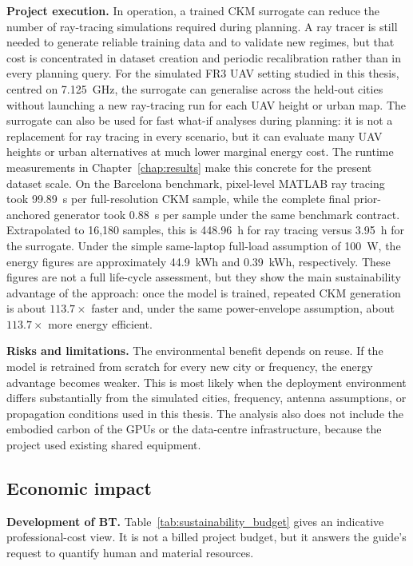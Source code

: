 \textbf{Project execution.} In operation, a trained CKM surrogate can reduce
the number of ray-tracing simulations required during planning. A ray tracer is
still needed to generate reliable training data and to validate new regimes,
but that cost is concentrated in dataset creation and periodic recalibration
rather than in every planning query. For the simulated FR3 UAV setting studied
in this thesis, centred on \SI{7.125}{GHz}, the surrogate can generalise across
the held-out cities without launching a new ray-tracing run for each UAV height
or urban map.
The surrogate can also be used for fast what-if analyses during planning:
it is not a replacement for ray tracing in every scenario, but it can evaluate
many UAV heights or urban alternatives at much lower marginal energy cost.
The runtime measurements in Chapter~\ref{chap:results} make this concrete for
the present dataset scale. On the Barcelona benchmark, pixel-level MATLAB ray
tracing took \SI{99.89}{s} per full-resolution CKM sample, while the complete
final prior-anchored generator took \SI{0.88}{s} per sample under the same
benchmark contract.
Extrapolated to 16{,}180 samples, this is \SI{448.96}{h} for ray tracing versus
\SI{3.95}{h} for the surrogate. Under the simple same-laptop full-load
assumption of \SI{100}{W}, the energy figures are approximately
\SI{44.9}{kWh} and \SI{0.39}{kWh}, respectively. These figures are not a full
life-cycle assessment, but they show the main sustainability advantage of the
approach: once the model is trained, repeated CKM generation is about
\(113.7\times\) faster and, under the same power-envelope assumption, about
\(113.7\times\) more energy efficient.


\textbf{Risks and limitations.} The environmental benefit depends on reuse. If
the model is retrained from scratch for every new city or frequency, the energy
advantage becomes weaker. This is most likely when the deployment environment
differs substantially from the simulated cities, frequency, antenna assumptions,
or propagation conditions used in this thesis.
The analysis also does not include the embodied carbon of the GPUs or the data-centre infrastructure,
because the project used existing shared equipment.

\subsection{Economic impact}

\textbf{Development of BT.} Table~\ref{tab:sustainability_budget} gives an
indicative professional-cost view. It is not a billed project budget, but it
answers the guide's request to quantify human and material resources.

